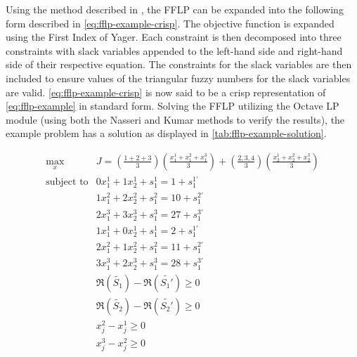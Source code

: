 \documentclass[ee,thesis]{usuthesis}
\begin{document}
Using the method described in , the FFLP can be expanded into the following form
described in \ref{eq:fflp-example-crisp}. The objective function is expanded using the First Index of Yager. Each constraint
is then decomposed into three constraints with slack variables appended to the left-hand side and right-hand side of
their respective equation. The constraints for the slack variables are then included to ensure values of the triangular
fuzzy numbers for the slack variables are valid. \ref{eq:fflp-example-crisp} is now said to be a crisp representation of
\ref{eq:fflp-example} in standard form. Solving the FFLP utilizing the Octave LP module (using both the Nasseri and Kumar
methods to verify the results), the example problem has a solution as displayed in \ref{tab:fflp-example-solution}.

\begin{equation}
\label{eq:fflp-example-crisp}
\begin{array}{ll}
\underset{x}{\text{max}} & J = (\frac{1+2+3}{3})  (\frac{x_1^1 + x_1^2 + x_1^3}{3}) + (\frac{2,3,4}{3})  (\frac{x_2^1 + x_2^2 + x_2^3}{3}) \\
\text{subject to}        &  0x_1^1 + 1x_2^1 + s_1^1 = 1 + s_1^{1'}                                                                  \\
                         &  1x_1^2 + 2x_2^2 + s_1^2 = 10 + s_1^{2'}                                                                  \\
                         &  2x_1^3 + 3x_2^3 + s_1^3 = 27 + s_1^{3'}                                                                  \\
                         &  1x_1^1 + 0x_2^1 + s_1^1 = 2 + s_1^{1'}                                                                  \\
                         &  2x_1^2 + 1x_2^2 + s_1^2 = 11 + s_1^{2'}                                                                  \\
                         &  3x_1^3 + 2x_2^3 + s_1^3 = 28 + s_1^{3'}                                                                  \\
                         & \mathfrak{R}(\tilde{S_1}) - \mathfrak{R}(\tilde{S_1'}) \ge 0                                                                    \\
                         & \mathfrak{R}(\tilde{S_2}) - \mathfrak{R}(\tilde{S_2'}) \ge 0                                                                    \\
                         & x_j^2 - x_j^1 \ge 0                                                                                        \\
                         & x_j^3 - x_j^2 \ge 0                                                                                        \\
\end{array}
\end{equation}
\end{document}
